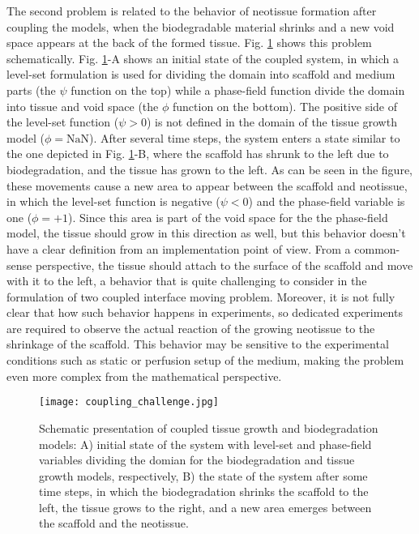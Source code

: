 The second problem is related to the behavior of neotissue formation after coupling the models, when the biodegradable material shrinks and a new void space appears at the back of the formed tissue. Fig. \ref{fig:tissue_coupling_challenge} shows this problem schematically. Fig. \ref{fig:tissue_coupling_challenge}-A shows an initial state of the coupled system, in which a level-set formulation is used for dividing the domain into scaffold and medium parts (the $\psi$ function on the top) while a phase-field function divide the domain into tissue and void space (the $\phi$ function on the bottom). The positive side of the level-set function ($\psi > 0$) is not defined in the domain of the tissue growth model ($\phi=\text{NaN}$). After several time steps, the system enters a state similar to the one depicted in Fig. \ref{fig:tissue_coupling_challenge}-B, where the scaffold has shrunk to the left due to biodegradation, and the tissue has grown to the left. As can be seen in the figure, these movements cause a new area to appear between the scaffold and neotissue, in which the level-set function is negative ($\psi < 0$) and the phase-field variable is one ($\phi=+1$). Since this area is part of the void space for the the phase-field model, the tissue should grow in this direction as well, but this behavior doesn't have a clear definition from an implementation point of view. From a common-sense perspective, the tissue should attach to the surface of the scaffold and move with it to the left, a behavior that is quite challenging to consider in the formulation of two coupled interface moving problem. Moreover, it is not fully clear that how such behavior happens in experiments, so dedicated experiments are required to observe the actual reaction of the growing neotissue to the shrinkage of the scaffold. This behavior may be sensitive to the experimental conditions such as static or perfusion setup of the medium, making the problem even more complex from the mathematical perspective.


\begin{figure}
\medskip
\centering
\texttt{[image: coupling\_challenge.jpg]}
\caption[Schematic presentation of coupled tissue growth and biodegradation models]{Schematic presentation of coupled tissue growth and biodegradation models: A) initial state of the system with level-set and phase-field variables dividing the domian for the biodegradation and tissue growth models, respectively, B) the state of the system after some time steps, in which the biodegradation shrinks the scaffold to the left, the tissue grows to the right, and a new area emerges between the scaffold and the neotissue.}
\label{fig:tissue_coupling_challenge}
\end{figure}

